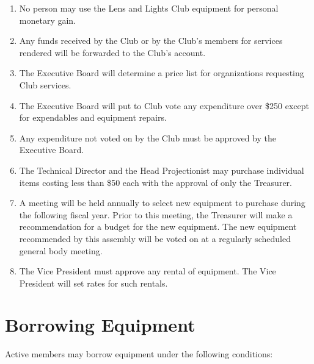\documentclass[12pt,letterpaper]{book}
\begin{document}
\begin{enumerate}

\item No person may use the Lens and Lights Club equipment for personal monetary gain.
\item Any funds received by the Club or by the Club's members for services rendered will be forwarded to the Club's account.
\item The Executive Board will determine a price list for organizations requesting Club services.
\item The Executive Board will put to Club vote any expenditure over \$250 except for expendables and equipment repairs.
\item Any expenditure not voted on by the Club must be approved by the Executive Board.
\item The Technical Director and the Head Projectionist may purchase individual items costing less than \$50 each with the approval of only the Treasurer.
\item A meeting will be held annually to select new equipment to purchase during the following fiscal year. Prior to this meeting, the Treasurer will make a recommendation for a budget for the new equipment. The new equipment recommended by this assembly will be voted on at a regularly scheduled general body meeting.
\item The Vice President must approve any rental of equipment. The Vice President will set rates for such rentals.

\end{enumerate}

\section{Borrowing Equipment}

Active members may borrow equipment under the following conditions:
\end{document}
